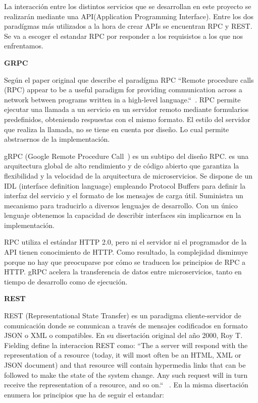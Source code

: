 La interacción entre los distintos servicios que se desarrollan en este proyecto se realizarán mediante una \gls{API}(Application Programming Interface).
Entre los dos paradígmas más utilizados a la hora de crear APIs se encuentran RPC y REST. Se va a escoger el estandar RPC por responder a los requisistos a los que nos enfrentamos.

\textbf{GRPC}

Según el paper original que describe el paradígma RPC “Remote procedure calls (RPC) appear to be a useful paradigm for providing communication across a
network between programs written in a high-level language.“~\cite{Birrell198439}.
RPC permite ejecutar una llamada a un servicio en un servidor remoto mediante formularios predefinidos, obteniendo respuestas con el mismo formato.
El estilo del servidor que realiza la llamada, no se tiene en cuenta por diseño.
Lo cual permite abstraernos de la implementación.

gRPC (Google Remote Procedure Call~\cite{grpc}) es un subtipo del diseño RPC.  es una arquitectura global de alto rendimiento y de código abierto que garantiza la flexibilidad y la velocidad de la arquitectura de microservicios.
Se dispone de un \gls{IDL} (interface definition language) empleando Protocol Buffers para definir la interfaz del servicio y el formato de los mensajes de carga útil.
Suministra un mecanismo para traducirlo a diversos lenguajes de desarrollo.
Con un único lenguaje obtenemos la capacidad de describir interfaces sin implicarnos en la implementación.

RPC utiliza el estándar HTTP 2.0, pero ni el servidor ni el programador de la API tienen conocimiento de HTTP. Como resultado, la complejidad disminuye porque no hay que preocuparse por cómo se traducen los principios de RPC a HTTP. gRPC acelera la transferencia de datos entre microservicios, tanto en tiempo de desarrollo como de ejecución.

\textbf{REST}

\gls{REST} (Representational State Transfer) es un paradigma cliente-servidor de comunicación donde se comunican a través de mensajes codificados en formato JSON o XML o compatibles.
En su disertación original del año 2000, Roy T. Fielding define la interaccion REST como: “The a server will respond with the representation of a resource (today, it will most often be an HTML, XML or JSON document) and that resource will contain hypermedia links that can be followed to make the state of the system change.
Any such request will in turn receive the representation of a resource, and so on.“ ~\cite{FieldingRoyThomas2000Asat}.
En la misma disertación enumera los principios que ha de seguir el estandar:

